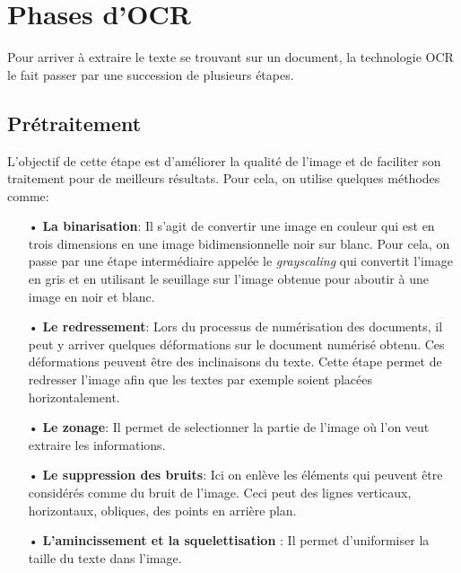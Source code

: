 \section{Phases d'OCR}
Pour arriver à extraire le texte se trouvant sur un document, la technologie OCR le fait passer par une succession de plusieurs étapes.
    \subsection{Prétraitement}
    L’objectif de cette étape est d’améliorer la qualité de l’image et de faciliter son traitement pour de meilleurs résultats. Pour cela, on utilise quelques méthodes comme:
    \begin{itemize}
        \item[•]\textbf{La binarisation}: Il s'agit de convertir une image en couleur qui est en trois dimensions en une image bidimensionnelle noir sur blanc. Pour cela, on passe par une étape intermédiaire
        appelée le \textit{grayscaling} qui convertit l'image en gris et en utilisant le seuillage sur l'image obtenue pour aboutir à une image en noir et blanc.
        \item[•]\textbf{Le redressement}: Lors du processus de numérisation des documents, il peut y arriver
        quelques déformations sur le document numérisé obtenu. Ces déformations peuvent être des
        inclinaisons du texte. Cette étape permet de redresser l'image afin que les textes par exemple
        soient placées horizontalement.
        \item[•]\textbf{Le zonage}: Il permet de selectionner la partie de l'image où l'on veut extraire les informations.
        \item[•]\textbf{Le suppression des bruits}: Ici on enlève les éléments qui peuvent être considérés comme du bruit de l'image. Ceci peut des lignes verticaux, horizontaux, obliques, des points en arrière plan.
        \item[•]\textbf{L'amincissement et la squelettisation }: Il permet d'uniformiser la taille du texte dans l'image.   
    \end{itemize}

